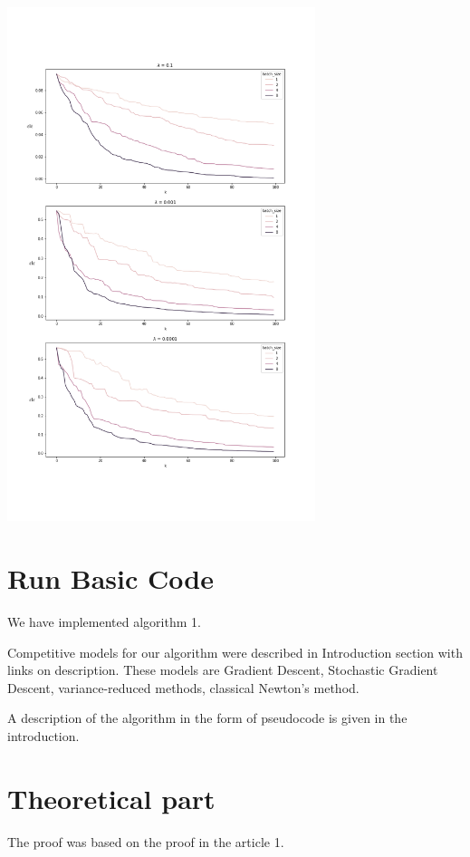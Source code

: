 \documentclass{article}
\begin{document}
\includegraphics[width=90mm]{plot.png}

\section{Run Basic Code}
We have implemented algorithm 1. 

Competitive models for our algorithm were described in Introduction section with links on description. These models are  Gradient Descent, Stochastic Gradient Descent, variance-reduced methods, classical Newton's method.

A description of the algorithm in the form of pseudocode is given in the introduction.
\section{Theoretical part}

The proof was based on the proof in the article 1.
\end{document}
